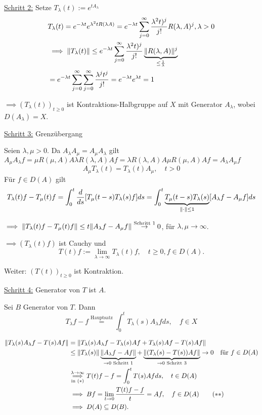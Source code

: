 \underline{Schritt 2:} Setze $T_\lambda(t) := e^{tA_\lambda}$
\begin{align*}
& T_\lambda(t) = e^{-\lambda t} e^{\lambda^2 t R(\lambda A)}
= e^{-\lambda t} \sum_{j = 0}^\infty \frac{\lambda^2 t)^j}{j!} R(\lambda, A)^j, \lambda > 0 \\
&\implies \lVert T_\lambda(t) \rVert \leq e^{-\lambda t } \sum_{j = 0}^\infty \frac{\lambda^2 t)^j}{j!} \underbrace{\lVert R(\lambda, A) \rVert^j}_{\leq \frac{1}{\lambda}} \\
&= e^{-\lambda t} \sum_{j = 0}^\infty \sum_{j = 0}^\infty \frac{\lambda^j t^j}{j!} = e^{-\lambda t} e^{\lambda t} = 1
\end{align*}

$\implies (T_\lambda(t))_{t \geq 0}$ ist Kontraktions-Halbgruppe auf $X$ mit Generator $A_\lambda$, wobei $D(A_\lambda) = X$.

\underline{Schritt 3:} Grenzübergang

Seien $\lambda, \mu > 0$.
Da $A_\lambda A_\mu = A_\mu A_\lambda$ gilt
{\tiny{$A_\mu A_\lambda f  =  \mu R(\mu, A) A \lambda R(\lambda, A) A f = \lambda R(\lambda, A) A \mu R(\mu, A) A  f = A_\lambda A_\mu f$}}
$$
A_\mu T_\lambda(t) = T_\lambda(t) A_\mu, \quad t >0
$$
Für $f \in D(A)$ gilt
$$
T_\lambda(t) f - T_\mu(t) f = \int_0^t \frac{d}{ds} [T_\mu(t - s) T_\lambda(s) f ] ds = \int_0^t \underbrace{T_\mu(t - s) T_\lambda(s)}_{\lVert \cdot \rVert \leq 1} [A_\lambda f - A_\mu f] ds
$$

$\implies \lVert T_\lambda(t) f - T_\mu(t) f  \rVert \leq t \lVert A_\lambda f - A_\mu f  \rVert \overset{\text{Schritt 1}}{\to} 0$, für $\lambda, \mu \to \infty$.

$\implies (T_\lambda(t) f)$ ist Cauchy und
$$
T(t) f := \lim_{\lambda \to \infty} T_\lambda(t) f, \quad t \geq 0, f \in D(A).
$$ 

Weiter: $(T(t))_{t \geq 0}$ ist Kontraktion.

\underline{Schritt 4:} Generator von $T$ ist $A$.

Sei $B$ Generator von $T$. Dann
\begin{displaymath}
T_\lambda f - f \overset{\text{Hauptsatz}}{=} \int_0^t T_\lambda(s) A_\lambda f ds, \quad f \in X \tag{$\ast$}
\end{displaymath}

\begin{align*}
\lVert T_\lambda(s) A_\lambda f - T(s) A f \rVert
&= \lVert T_\lambda(s) A_\lambda f - T_\lambda(s)Af + T_\lambda(s) Af - T(s) Af  \rVert \\
&\leq \lVert T_\lambda(s)  \rVert \underbrace{\lVert A_\lambda f - A f \rVert}_{\to 0 \text{ Schritt 1}} + \underbrace{\lVert (T_\lambda(s) - T(s))Af  \rVert}_{\to 0 \text{ Schritt 3}} \to 0 \quad\text{für } f \in D(A) \\
&\overset{\lambda \to \infty}{\underset{\text{in ($\ast$)}}{\implies}} T(t) f - f = \int_0^t T(s) A f ds, \quad t \in D(A) \\
&\implies  Bf = \lim_{t \to 0} \frac{ T(t) f - f}{t} = Af, \quad f \in D(A) \tag{$\ast\ast$} \\
&\implies D(A) \subseteq D(B).
\end{align*}

